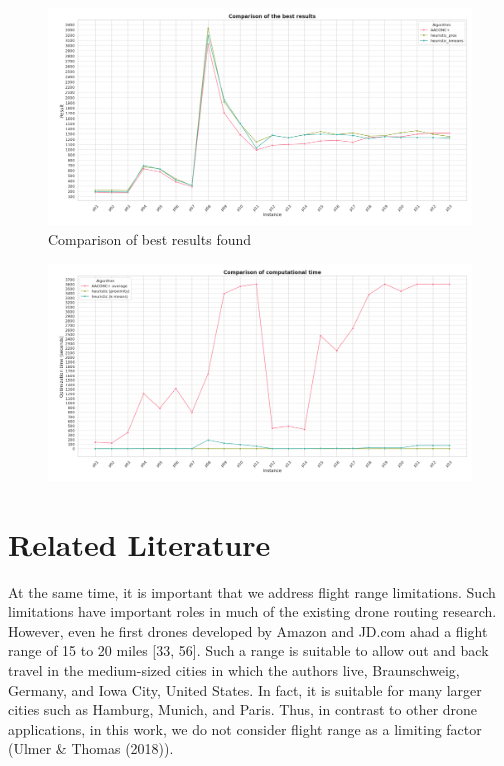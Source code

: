 \documentclass{article}
\begin{document}
	\begin{figure}[h!]
		\centering
		\caption{Comparison of best results found}
		\includegraphics[width=\textwidth]{best_results_all_lineGraph}
	\end{figure}
	\begin{figure}[h!]
		\centering
		\caption{}
		\includegraphics[width=\textwidth]{optimization_times}
	\end{figure}
	
	
	
	\clearpage
	
	\twocolumn
	
	\section{Related Literature}
	
	At the same time, it is important that we address flight range limitations. Such limitations have important roles in much of
	the existing drone routing research. However, even he first drones developed by Amazon and JD.com ahad a flight range of 15
	to 20 miles [33, 56]. Such a range is suitable to allow out and back travel in the medium-sized cities in which the authors live,
	Braunschweig, Germany, and Iowa City, United States. In fact, it is suitable for many larger cities such as Hamburg, Munich,
	and Paris. Thus, in contrast to other drone applications, in this work, we do not consider flight range as a limiting factor (Ulmer \& Thomas (2018)).
	
	
	
\end{document}
